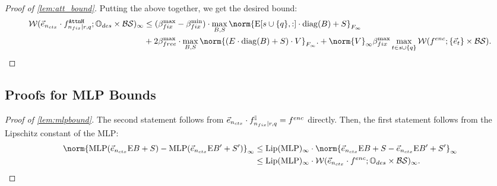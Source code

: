 \begin{proof}[Proof of \cref{lem:att_bound}]
	Putting the above together, we get the desired bound:
	\begin{align*}
		\WD(\vecNctx \cdot f^{\attnH}_{\ndes \mid r, q} ; \InpSpace \times \blowupSet \shiftSet)_\infty
	     &\leq
	     (\ssMaxRB - \ssMinRB) \cdot \max_{B, S}\norm{\Embed[\desSet \cup \{q\}, :] \cdot \diag(B) + S}_{\frobInf} \\
	     &+ 2 \ssMaxFB \cdot \max_{B, S} \norm{(E \cdot \diag(B) + S) \cdot V}_{\frobInf}.
	     + \norm{V}_\infty \ssMaxRB \max_{t \in s \cup \{q\}} \WD(\fenc; \{\vece_{t}\} \times \blowupSet \shiftSet).
	\end{align*}

\end{proof}


\subsection{Proofs for MLP Bounds}
\begin{proof}[Proof of \cref{lem:mlpbound}]
	\label{proof:mlp_bound}
	The second statement follows from $\vec{e}_{n_{ctx}} \cdot f^{\mathbb{I}}_{n_{fix} \mid r, q} = f^{enc}$ directly.
	Then, the first statement follows from the Lipschitz constant of the MLP:
	\begin{align*}
		\norm{\MLP(\vec{e}_\nctx \Embed B + S) - \MLP(\vec{e}_\nctx \Embed B' + S')}_\infty
			&\leq \LipMLP_\infty \cdot \norm{\vec{e}_\nctx \Embed B + S - \vec{e}_\nctx \Embed B' + S'}_\infty \\ &\leq \LipMLP_\infty \cdot \WD(\vec{e}_\nctx \cdot  \fenc; \InpSpace \times \blowupSet \shiftSet)_\infty.
	\end{align*}
\end{proof}

